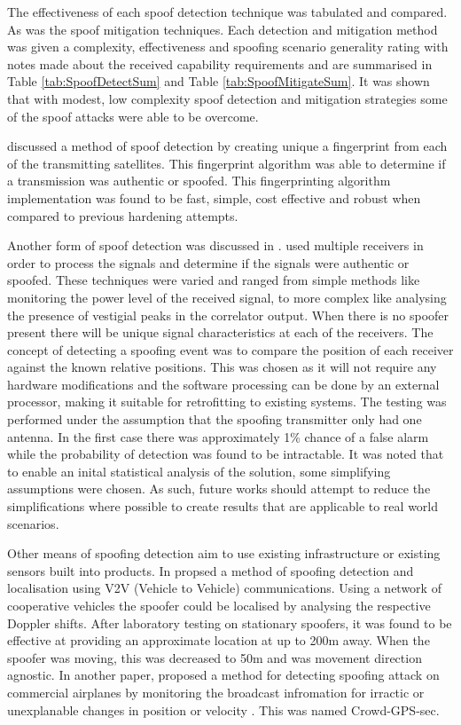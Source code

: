 The effectiveness of each spoof detection technique was tabulated and compared. As was the spoof mitigation techniques. Each detection and mitigation method was given a
complexity, effectiveness and spoofing scenario generality rating with notes made about the received capability requirements and are summarised in Table
\ref{tab:SpoofDetectSum} and Table \ref{tab:SpoofMitigateSum}. It was shown that with modest, low complexity spoof detection and mitigation strategies some of the spoof
attacks were able to be overcome.

\textcite{RN7} discussed a method of spoof detection by creating unique a fingerprint from each of the transmitting satellites. This fingerprint algorithm was able to determine if a transmission was
authentic or spoofed. This fingerprinting algorithm implementation was found to be fast, simple, cost effective and robust when compared to previous hardening attempts.

Another form of spoof detection was discussed in \cite{RN10}. \textcite{RN10} used multiple receivers in order to process the signals and determine if the signals were
authentic or spoofed. These techniques were varied and ranged from simple methods like monitoring the power level
of the received signal, to more complex like analysing the presence of vestigial peaks in the correlator output. When there is no spoofer present there will be unique signal
characteristics at each of the receivers. The concept of detecting a spoofing event was to compare the position of each receiver against the known relative positions. This
was chosen as it will not require any hardware modifications and the software processing can be done by an external processor, making it suitable for retrofitting to
existing systems. The testing was performed under the assumption that the spoofing transmitter only had one antenna. In the
first case there was approximately 1\% chance of a false alarm while the probability of detection was found to be intractable.
It was noted that to enable an inital statistical analysis of the solution, some simplifying assumptions were chosen. As such, future works should attempt to reduce the
simplifications where possible to create results that are applicable to real world scenarios.

Other means of spoofing detection aim to use existing infrastructure or existing sensors built into products. In \cite{RN1} \citeauthor{RN1} propsed a method of spoofing
detection and localisation using V2V (Vehicle to Vehicle) communications. Using a network of cooperative vehicles the spoofer could be localised by analysing the respective
Doppler shifts. After laboratory testing on stationary spoofers, it was found to be effective at providing an approximate location at up to 200m away.
When the spoofer was moving, this was decreased to 50m and was movement direction agnostic. In another paper, \citeauthor{RN24} proposed a method for detecting spoofing
attack on commercial airplanes by monitoring the broadcast infromation for irractic or unexplanable changes in position or velocity \cite{RN24}. This was named
Crowd-GPS-sec.

